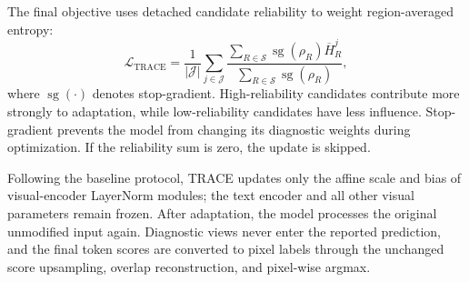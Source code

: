 \documentclass[letterpaper]{article}
\begin{document}
	The final objective uses detached candidate reliability to weight region-averaged entropy:
	\begin{equation}
		\mathcal L_{\mathrm{TRACE}}
		=
		\frac{1}{|\mathcal J|}
		\sum_{j\in\mathcal J}
		\frac{
			\displaystyle
			\sum_{R\in\mathcal S}
			\operatorname{sg}(\rho_R)
			\overline H_R^j
		}{
			\displaystyle
			\sum_{R\in\mathcal S}
			\operatorname{sg}(\rho_R)
		},
	\end{equation}
	where $\operatorname{sg}(\cdot)$ denotes stop-gradient. High-reliability candidates contribute more strongly to adaptation, while low-reliability candidates have less influence. Stop-gradient prevents the model from changing its diagnostic weights during optimization. If the reliability sum is zero, the update is skipped.
	
	Following the baseline protocol, TRACE updates only the affine scale and bias of visual-encoder LayerNorm modules; the text encoder and all other visual parameters remain frozen. After adaptation, the model processes the original unmodified input again. Diagnostic views never enter the reported prediction, and the final token scores are converted to pixel labels through the unchanged score upsampling, overlap reconstruction, and pixel-wise argmax.
	
	
	
	
	
\end{document}
